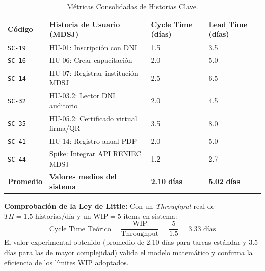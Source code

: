 \begin{table}[H]
\centering
\small
\caption{Métricas Consolidadas de Historias Clave.}
\label{tab:metricas_historias}
\begin{tabularx}{\textwidth}{P{2.0cm} Y P{2.5cm} P{2.5cm}}
\toprule
\textbf{Código} & \textbf{Historia de Usuario (MDSJ)} & \textbf{Cycle Time (días)} & \textbf{Lead Time (días)} \\
\midrule
\texttt{SC-19} & HU-01: Inscripción con DNI & 1.5 & 3.5 \\
\texttt{SC-16} & HU-06: Crear capacitación & 2.0 & 5.0 \\
\texttt{SC-14} & HU-07: Registrar institución MDSJ & 2.5 & 6.5 \\
\texttt{SC-32} & HU-03.2: Lector DNI auditorio & 2.0 & 4.5 \\
\texttt{SC-35} & HU-05.2: Certificado virtual firma/QR & 3.5 & 8.0 \\
\texttt{SC-41} & HU-14: Registro anual PDP & 2.0 & 5.0 \\
\texttt{SC-44} & Spike: Integrar API RENIEC MDSJ & 1.2 & 2.7 \\
\midrule
\textbf{Promedio} & \textbf{Valores medios del sistema} & \textbf{2.10 días} & \textbf{5.02 días} \\
\bottomrule
\end{tabularx}
\end{table}

\noindent\textbf{Comprobación de la Ley de Little:} Con un \textit{Throughput} real de $TH = 1.5 \text{ historias/día}$ y un $\text{WIP} = 5$ ítems en sistema:
\begin{equation}
    \text{Cycle Time Teórico} = \frac{\text{WIP}}{\text{Throughput}} = \frac{5}{1.5} = 3.33 \text{ días}
\end{equation}
El valor experimental obtenido (promedio de 2.10 días para tareas estándar y 3.5 días para las de mayor complejidad) valida el modelo matemático y confirma la eficiencia de los límites WIP adoptados.
